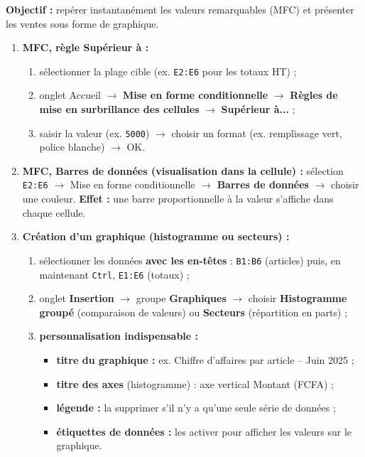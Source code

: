 \documentclass[11pt]{article}
\begin{document}
\begin{methode}
\textbf{Objectif :} repérer instantanément les valeurs remarquables (MFC) et présenter les ventes sous forme de graphique.
\begin{enumerate}
    \item \textbf{MFC, règle \og{}Supérieur à\fg{} :}
    \begin{enumerate}
        \item sélectionner la plage cible (ex. \texttt{E2:E6} pour les totaux HT) ;
        \item onglet Accueil $\rightarrow$ \textbf{Mise en forme conditionnelle} $\rightarrow$ \textbf{Règles de mise en surbrillance des cellules} $\rightarrow$ \textbf{Supérieur à...} ;
        \item saisir la valeur (ex. \texttt{5000}) $\rightarrow$ choisir un format (ex. remplissage vert, police blanche) $\rightarrow$ OK.
    \end{enumerate}
    \item \textbf{MFC, \og{}Barres de données\fg{} (visualisation dans la cellule) :} sélection \texttt{E2:E6} $\rightarrow$ Mise en forme conditionnelle $\rightarrow$ \textbf{Barres de données} $\rightarrow$ choisir une couleur. \textbf{Effet :} une barre proportionnelle à la valeur s'affiche dans chaque cellule.
    \item \textbf{Création d'un graphique (histogramme ou secteurs) :}
    \begin{enumerate}
        \item sélectionner les données \textbf{avec les en-têtes} : \texttt{B1:B6} (articles) puis, en maintenant \texttt{Ctrl}, \texttt{E1:E6} (totaux) ;
        \item onglet \textbf{Insertion} $\rightarrow$ groupe \textbf{Graphiques} $\rightarrow$ choisir \textbf{Histogramme groupé} (comparaison de valeurs) ou \textbf{Secteurs} (répartition en parts) ;
        \item \textbf{personnalisation indispensable :}
        \begin{itemize}
            \item \textbf{titre du graphique :} ex. \og{}Chiffre d'affaires par article -- Juin 2025\fg{} ;
            \item \textbf{titre des axes} (histogramme) : axe vertical \og{}Montant (FCFA)\fg{} ;
            \item \textbf{légende :} la supprimer s'il n'y a qu'une seule série de données ;
            \item \textbf{étiquettes de données :} les activer pour afficher les valeurs sur le graphique.
        \end{itemize}
    \end{enumerate}
\end{enumerate}
\end{methode}
\end{document}
